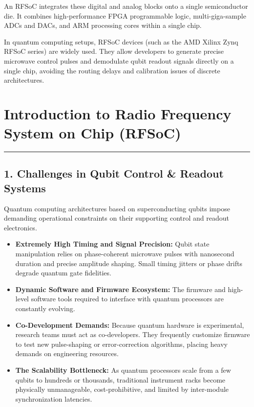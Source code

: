 \documentclass[
]{article}
\providecommand{\tightlist}{%
  \setlength{\itemsep}{0pt}\setlength{\parskip}{0pt}}
\begin{document}
An RFSoC integrates these digital and analog blocks onto a single
semiconductor die. It combines high-performance FPGA programmable logic,
multi-giga-sample ADCs and DACs, and ARM processing cores within a
single chip.

In quantum computing setups, RFSoC devices (such as the AMD Xilinx Zynq
RFSoC series) are widely used. They allow developers to generate precise
microwave control pulses and demodulate qubit readout signals directly
on a single chip, avoiding the routing delays and calibration issues of
discrete architectures.

\section{Introduction to Radio Frequency System on Chip
(RFSoC)}\label{introduction-to-radio-frequency-system-on-chip-rfsoc}

\begin{center}\rule{0.5\linewidth}{0.5pt}\end{center}

\subsection{1. Challenges in Qubit Control \& Readout
Systems}\label{challenges-in-qubit-control-readout-systems}

Quantum computing architectures based on superconducting qubits impose
demanding operational constraints on their supporting control and
readout electronics.

\begin{itemize}
\tightlist
\item
  \textbf{Extremely High Timing and Signal Precision:} Qubit state
  manipulation relies on phase-coherent microwave pulses with nanosecond
  duration and precise amplitude shaping. Small timing jitters or phase
  drifts degrade quantum gate fidelities.
\item
  \textbf{Dynamic Software and Firmware Ecosystem:} The firmware and
  high-level software tools required to interface with quantum
  processors are constantly evolving.
\item
  \textbf{Co-Development Demands:} Because quantum hardware is
  experimental, research teams must act as co-developers. They
  frequently customize firmware to test new pulse-shaping or
  error-correction algorithms, placing heavy demands on engineering
  resources.
\item
  \textbf{The Scalability Bottleneck:} As quantum processors scale from
  a few qubits to hundreds or thousands, traditional instrument racks
  become physically unmanageable, cost-prohibitive, and limited by
  inter-module synchronization latencies.
\end{itemize}
\end{document}
